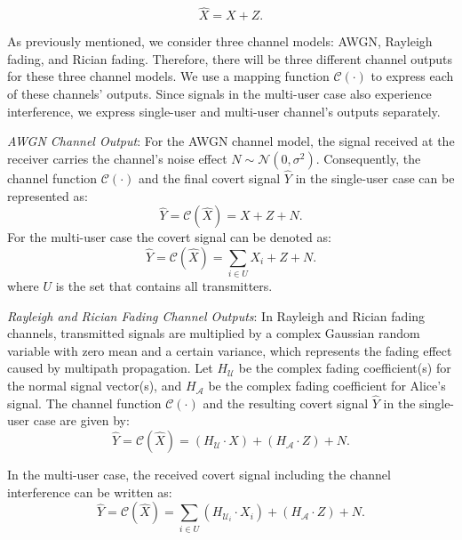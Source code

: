 \begin{equation}
	\hat{X} = X + Z.
\end{equation}

As previously mentioned, we consider three channel models: AWGN, Rayleigh fading, and Rician fading. Therefore, there will be three different channel outputs for these three channel models. We use a mapping function \(\mathcal{C}(\cdot)\) to express each of these channels' outputs. Since signals in the multi-user case also experience interference, we express single-user and multi-user channel's outputs separately.

\textit{AWGN Channel Output}: For the AWGN channel model, the signal received at the receiver carries the channel's noise effect \(N \sim \mathcal{N}(0, \sigma^2)\). Consequently, the channel function \(\mathcal{C}(\cdot)\) and the final covert signal \(\hat{Y}\) in the single-user case can be represented as:
\begin{equation}
	\hat{Y} = \mathcal{C}(\hat{X}) = X + Z + N.
\end{equation}
For the multi-user case the covert signal can be denoted as:
\begin{equation}
	 \hat{Y} = \mathcal{C}(\hat{X}) = \sum_{i \in U}X_i + Z + N.
\end{equation}
where \(U\) is the set that contains all transmitters.

\textit{Rayleigh and Rician Fading Channel Outputs}: In Rayleigh and Rician fading channels, transmitted signals are multiplied by a complex Gaussian random variable with zero mean and a certain variance, which represents the fading effect caused by multipath propagation. Let \(H_{\mathcal{U}}\) be the complex fading coefficient(s) for the normal signal vector(s), and \(H_{\mathcal{A}}\) be the complex fading coefficient for Alice's signal. The channel function \(\mathcal{C}(\cdot)\) and the resulting covert signal \(\hat{Y}\) in the single-user case are given by:
\begin{equation}
	\hat{Y} = \mathcal{C}(\hat{X}) = (H_{\mathcal{U}} \cdot X) + (H_{\mathcal{A}} \cdot Z) + N.
\end{equation}

In the multi-user case, the received covert signal including the channel interference can be written as:
\begin{equation}
	\hat{Y} = \mathcal{C}(\hat{X}) = \sum_{i \in U}(H_{\mathcal{U}_i} \cdot X_i) + (H_{\mathcal{A}} \cdot Z) + N.
\end{equation}

